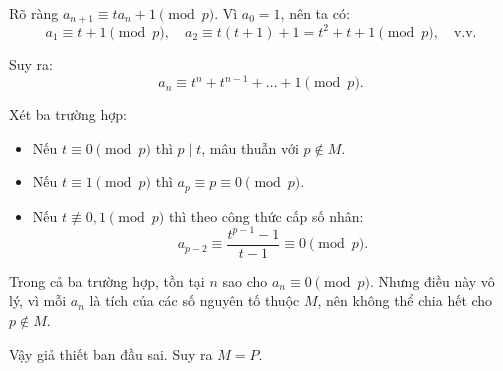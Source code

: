 \documentclass[../09-contruction-methods.tex]{subfiles}
\begin{document}
\begin{soln}
	Rõ ràng $a_{n+1} \equiv ta_n + 1 \pmod{p}$. Vì $a_0 = 1$, nên ta có:
	\[
		a_1 \equiv t + 1 \pmod{p}, \quad a_2 \equiv t(t + 1) + 1 = t^2 + t + 1 \pmod{p}, \quad \text{v.v.}
	\]
	
	Suy ra:
	\[
		a_n \equiv t^n + t^{n-1} + \ldots + 1 \pmod{p}.
	\]
	
	Xét ba trường hợp:
	\begin{itemize}[topsep=0pt, partopsep=0pt, itemsep=0pt]
		\item Nếu $t \equiv 0 \pmod{p}$ thì $p \mid t$, mâu thuẫn với $p \notin M$.
		\item Nếu $t \equiv 1 \pmod{p}$ thì $a_p \equiv p \equiv 0 \pmod{p}$.
		\item Nếu $t \not\equiv 0,1 \pmod{p}$ thì theo công thức cấp số nhân:
		\[
			a_{p-2} \equiv \frac{t^{p-1} - 1}{t - 1} \equiv 0 \pmod{p}.
		\]
	\end{itemize}
	
	Trong cả ba trường hợp, tồn tại $n$ sao cho $a_n \equiv 0 \pmod{p}$. Nhưng điều này vô lý, vì mỗi $a_n$ là tích của các số nguyên tố thuộc $M$, nên không thể chia hết cho $p \notin M$.
	
	Vậy giả thiết ban đầu sai. Suy ra $M = P$.
\end{soln}

\end{document}

